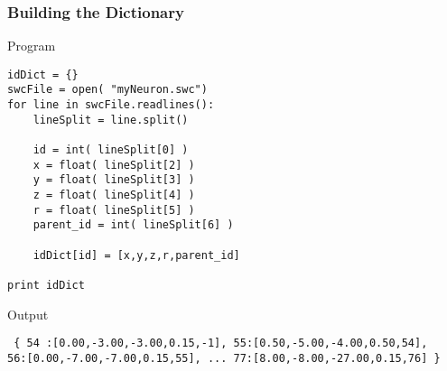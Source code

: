 \documentclass{beamer}
\begin{document}
\begin{frame}[fragile]
	\frametitle{Building the Dictionary}
	\scriptsize

\begin{block}{Program}
\begin{verbatim}
idDict = {}
swcFile = open( "myNeuron.swc")
for line in swcFile.readlines():
    lineSplit = line.split()
	
    id = int( lineSplit[0] )
    x = float( lineSplit[2] ) 
    y = float( lineSplit[3] ) 
    z = float( lineSplit[4] ) 
    r = float( lineSplit[5] ) 
    parent_id = int( lineSplit[6] ) 
	
    idDict[id] = [x,y,z,r,parent_id]

print idDict
\end{verbatim}
\end{block}

\begin{block}{Output}
\begin{verbatim} { 54 :[0.00,-3.00,-3.00,0.15,-1], 55:[0.50,-5.00,-4.00,0.50,54], 
56:[0.00,-7.00,-7.00,0.15,55], ... 77:[8.00,-8.00,-27.00,0.15,76] }
\end{verbatim}
\end{block}
\end{frame}
\end{document}
